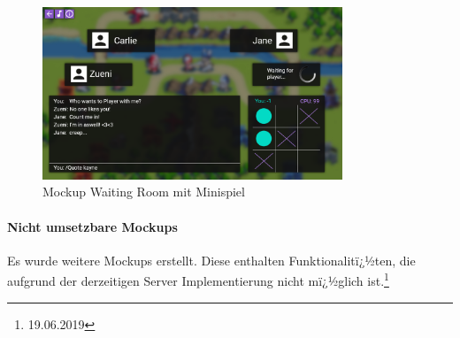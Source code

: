 \documentclass[12pt, titlepage]{scrartcl}
\begin{document}
		\begin{figure}[H] 
			\centering
			\includegraphics[width=0.8\textwidth]{Waiting_Room_Game_With_TTT.png}
			\caption{Mockup Waiting Room mit Minispiel}
			\label{WaitingRoomWithMiniGame}
		\end{figure}
	
		\paragraph{Nicht umsetzbare Mockups}
		Es wurde weitere Mockups erstellt. Diese enthalten Funktionalitï¿½ten, die aufgrund der derzeitigen Server Implementierung nicht mï¿½glich ist.\footnote{19.06.2019}
		
\end{document}

